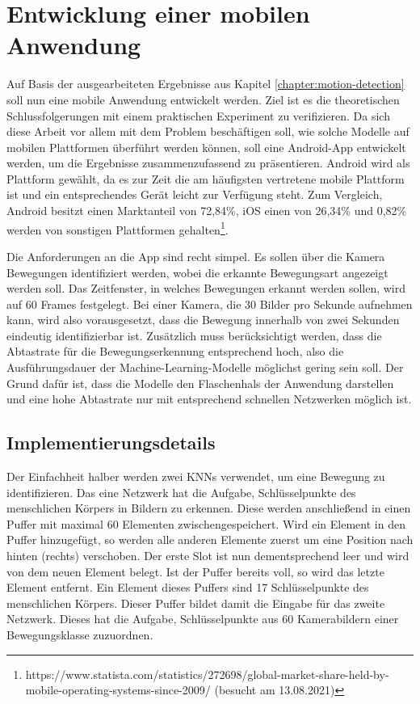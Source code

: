 \chapter{Entwicklung einer mobilen Anwendung}
Auf Basis der ausgearbeiteten Ergebnisse aus Kapitel
\ref{chapter:motion-detection} soll nun eine mobile Anwendung entwickelt werden.
Ziel ist es die theoretischen Schlussfolgerungen mit einem praktischen
Experiment zu verifizieren. Da sich diese Arbeit vor allem mit dem Problem
beschäftigen soll, wie solche Modelle auf mobilen Plattformen überführt werden
können, soll eine Android-App entwickelt werden, um die Ergebnisse
zusammenzufassend zu präsentieren. Android wird als Plattform gewählt, da es zur
Zeit die am häufigsten vertretene mobile Plattform ist und ein entsprechendes
Gerät leicht zur Verfügung steht. Zum Vergleich, Android besitzt einen
Marktanteil von 72,84\%, iOS einen von 26,34\% und 0,82\% werden von sonstigen
Plattformen
gehalten\footnote{https://www.statista.com/statistics/272698/global-market-share-held-by-mobile-operating-systems-since-2009/
(besucht am 13.08.2021)}.

Die Anforderungen an die App sind recht simpel. Es sollen über die Kamera
Bewegungen identifiziert werden, wobei die erkannte Bewegungsart angezeigt
werden soll. Das Zeitfenster, in welches Bewegungen erkannt werden sollen, wird
auf 60 Frames festgelegt. Bei einer Kamera, die 30 Bilder pro Sekunde aufnehmen
kann, wird also vorausgesetzt, dass die Bewegung innerhalb von zwei Sekunden
eindeutig identifizierbar ist. Zusätzlich muss berücksichtigt werden, dass die
Abtastrate für die Bewegungserkennung entsprechend hoch, also die
Ausführungsdauer der Machine-Learning-Modelle möglichst gering sein soll. Der
Grund dafür ist, dass die Modelle den Flaschenhals der Anwendung darstellen und
eine hohe Abtastrate nur mit entsprechend schnellen Netzwerken möglich ist.

\section{Implementierungsdetails}
Der Einfachheit halber werden zwei KNNs verwendet, um eine Bewegung zu
identifizieren. Das eine Netzwerk hat die Aufgabe, Schlüsselpunkte des
menschlichen Körpers in Bildern zu erkennen. Diese werden anschließend in einen
Puffer mit maximal 60 Elementen zwischengespeichert. Wird ein Element in den
Puffer hinzugefügt, so werden alle anderen Elemente zuerst um eine Position nach
hinten (rechts) verschoben. Der erste Slot ist nun dementsprechend leer und wird
von dem neuen Element belegt. Ist der Puffer bereits voll, so wird das letzte
Element entfernt. Ein Element dieses Puffers sind 17 Schlüsselpunkte des
menschlichen Körpers. Dieser Puffer bildet damit die Eingabe für das zweite
Netzwerk.  Dieses hat die Aufgabe, Schlüsselpunkte aus 60 Kamerabildern einer
Bewegungsklasse zuzuordnen.

